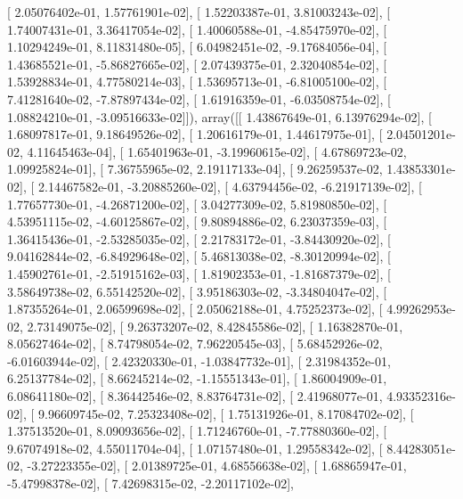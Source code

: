 \documentclass{article}
\begin{document}
       [  2.05076402e-01,   1.57761901e-02],
       [  1.52203387e-01,   3.81003243e-02],
       [  1.74007431e-01,   3.36417054e-02],
       [  1.40060588e-01,  -4.85475970e-02],
       [  1.10294249e-01,   8.11831480e-05],
       [  6.04982451e-02,  -9.17684056e-04],
       [  1.43685521e-01,  -5.86827665e-02],
       [  2.07439375e-01,   2.32040854e-02],
       [  1.53928834e-01,   4.77580214e-03],
       [  1.53695713e-01,  -6.81005100e-02],
       [  7.41281640e-02,  -7.87897434e-02],
       [  1.61916359e-01,  -6.03508754e-02],
       [  1.08824210e-01,  -3.09516633e-02]]), array([[  1.43867649e-01,   6.13976294e-02],
       [  1.68097817e-01,   9.18649526e-02],
       [  1.20616179e-01,   1.44617975e-01],
       [  2.04501201e-02,   4.11645463e-04],
       [  1.65401963e-01,  -3.19960615e-02],
       [  4.67869723e-02,   1.09925824e-01],
       [  7.36755965e-02,   2.19117133e-04],
       [  9.26259537e-02,   1.43853301e-02],
       [  2.14467582e-01,  -3.20885260e-02],
       [  4.63794456e-02,  -6.21917139e-02],
       [  1.77657730e-01,  -4.26871200e-02],
       [  3.04277309e-02,   5.81980850e-02],
       [  4.53951115e-02,  -4.60125867e-02],
       [  9.80894886e-02,   6.23037359e-03],
       [  1.36415436e-01,  -2.53285035e-02],
       [  2.21783172e-01,  -3.84430920e-02],
       [  9.04162844e-02,  -6.84929648e-02],
       [  5.46813038e-02,  -8.30120994e-02],
       [  1.45902761e-01,  -2.51915162e-03],
       [  1.81902353e-01,  -1.81687379e-02],
       [  3.58649738e-02,   6.55142520e-02],
       [  3.95186303e-02,  -3.34804047e-02],
       [  1.87355264e-01,   2.06599698e-02],
       [  2.05062188e-01,   4.75252373e-02],
       [  4.99262953e-02,   2.73149075e-02],
       [  9.26373207e-02,   8.42845586e-02],
       [  1.16382870e-01,   8.05627464e-02],
       [  8.74798054e-02,   7.96220545e-03],
       [  5.68452926e-02,  -6.01603944e-02],
       [  2.42320330e-01,  -1.03847732e-01],
       [  2.31984352e-01,   6.25137784e-02],
       [  8.66245214e-02,  -1.15551343e-01],
       [  1.86004909e-01,   6.08641180e-02],
       [  8.36442546e-02,   8.83764731e-02],
       [  2.41968077e-01,   4.93352316e-02],
       [  9.96609745e-02,   7.25323408e-02],
       [  1.75131926e-01,   8.17084702e-02],
       [  1.37513520e-01,   8.09093656e-02],
       [  1.71246760e-01,  -7.77880360e-02],
       [  9.67074918e-02,   4.55011704e-04],
       [  1.07157480e-01,   1.29558342e-02],
       [  8.44283051e-02,  -3.27223355e-02],
       [  2.01389725e-01,   4.68556638e-02],
       [  1.68865947e-01,  -5.47998378e-02],
       [  7.42698315e-02,  -2.20117102e-02],
\end{document}
